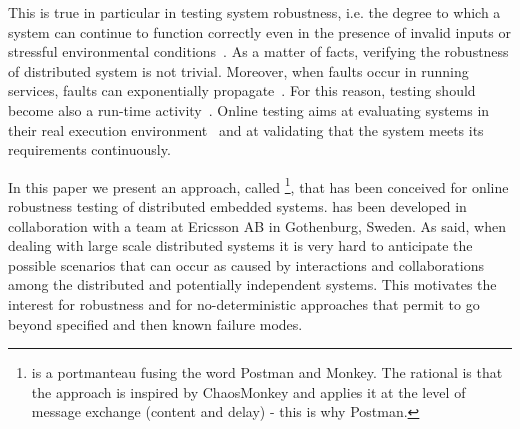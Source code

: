 This is true in particular in testing system robustness, i.e. the degree to which a system can continue to function correctly even in the presence of invalid inputs or stressful environmental conditions~\cite{STANDARD}.
As a matter of facts, verifying the robustness of distributed system is not trivial. %
Moreover, when faults occur in running services, faults can exponentially propagate~\cite{verification_testing}. 
For this reason, testing should become %
also a run-time activity~\cite{towards}. Online testing aims at evaluating systems in their real execution environment~\cite{Bertolino2012} and at validating %
that the system meets its requirements continuously. 


In this paper we present an approach,  called \approach{}\footnote{\approach{} is a portmanteau fusing the word Postman and Monkey. The rational is that the approach is inspired by ChaosMonkey and applies it at the level of message exchange (content and delay) - this is why Postman.}, that has been conceived for online robustness testing of distributed embedded systems. \approach{} has been developed in collaboration with a team at Ericsson AB in Gothenburg, Sweden. %
As said, when dealing with large scale distributed systems it is 
very hard to anticipate the possible scenarios that can occur as caused by interactions and collaborations among the distributed and potentially independent systems. This motivates the interest for robustness %
and for no-deterministic approaches that permit to go beyond specified and then known failure modes.

